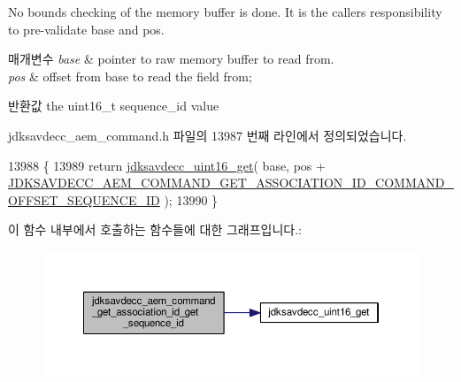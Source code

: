 No bounds checking of the memory buffer is done. It is the caller\textquotesingle{}s responsibility to pre-\/validate base and pos.


\begin{DoxyParams}{매개변수}
{\em base} & pointer to raw memory buffer to read from. \\
\hline
{\em pos} & offset from base to read the field from; \\
\hline
\end{DoxyParams}
\begin{DoxyReturn}{반환값}
the uint16\+\_\+t sequence\+\_\+id value 
\end{DoxyReturn}


jdksavdecc\+\_\+aem\+\_\+command.\+h 파일의 13987 번째 라인에서 정의되었습니다.


\begin{DoxyCode}
13988 \{
13989     \textcolor{keywordflow}{return} \hyperlink{group__endian_ga3fbbbc20be954aa61e039872965b0dc9}{jdksavdecc\_uint16\_get}( base, pos + 
      \hyperlink{group__command__get__association__id_ga56cc00f4851809a46a6a639c6a8180b4}{JDKSAVDECC\_AEM\_COMMAND\_GET\_ASSOCIATION\_ID\_COMMAND\_OFFSET\_SEQUENCE\_ID}
       );
13990 \}
\end{DoxyCode}


이 함수 내부에서 호출하는 함수들에 대한 그래프입니다.\+:
\nopagebreak
\begin{figure}[H]
\begin{center}
\leavevmode
\includegraphics[width=350pt]{group__command__get__association__id_gad67027ecbdffc86e43e24405c76834f1_cgraph}
\end{center}
\end{figure}


